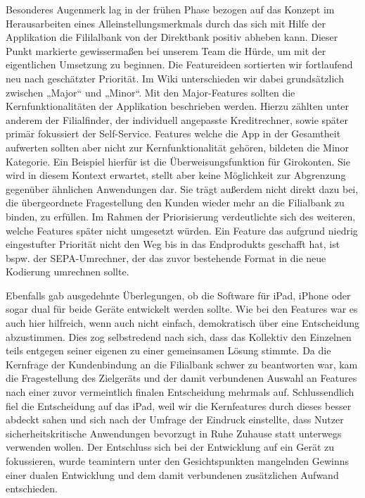 	Besonderes Augenmerk lag in der frühen Phase bezogen auf das Konzept im Herausarbeiten eines Alleinstellungsmerkmals durch das sich mit Hilfe der Applikation die Fililalbank von der Direktbank positiv abheben kann. Dieser Punkt markierte gewissermaßen bei unserem Team die Hürde, um mit der eigentlichen Umsetzung zu beginnen. Die Featureideen sortierten wir fortlaufend neu nach geschätzter Priorität. Im Wiki unterschieden wir dabei grundsätzlich zwischen „Major“ und „Minor“.  Mit den Major-Features sollten die Kernfunktionalitäten der Applikation beschrieben werden. Hierzu zählten unter anderem der Filialfinder, der individuell angepasste Kreditrechner, sowie später primär fokussiert der Self-Service. Features welche die App in der Gesamtheit aufwerten sollten aber nicht zur Kernfunktionalität gehören, bildeten die Minor Kategorie. Ein Beispiel hierfür ist die Überweisungsfunktion für Girokonten. Sie wird in diesem Kontext erwartet, stellt aber keine Möglichkeit zur Abgrenzung gegenüber ähnlichen Anwendungen dar. Sie trägt außerdem nicht direkt dazu bei, die übergeordnete Fragestellung den Kunden wieder mehr an die Filialbank zu binden, zu erfüllen. Im Rahmen der Priorisierung verdeutlichte sich des weiteren, welche Features später nicht umgesetzt würden. Ein Feature das aufgrund niedrig eingestufter Priorität nicht den Weg bis in das Endprodukts geschafft hat, ist bspw. der SEPA-Umrechner, der das zuvor bestehende Format in die neue Kodierung umrechnen sollte. 
	
	Ebenfalls gab ausgedehnte Überlegungen, ob die Software für iPad, iPhone oder sogar dual für beide Geräte entwickelt werden sollte. Wie bei den Features war es auch hier hilfreich, wenn auch nicht einfach, demokratisch über eine Entscheidung abzustimmen. Dies zog selbstredend nach sich, dass das Kollektiv den Einzelnen teils entgegen seiner eigenen zu einer gemeinsamen Lösung stimmte. Da die Kernfrage der Kundenbindung an die Filialbank schwer zu beantworten war, kam die Fragestellung des Zielgeräts und der damit verbundenen Auswahl an Features nach einer zuvor vermeintlich finalen Entscheidung mehrmals auf. Schlussendlich fiel die Entscheidung auf das iPad, weil wir die Kernfeatures durch dieses besser abdeckt sahen und sich nach der Umfrage der Eindruck einstellte, dass Nutzer sicherheitskritische Anwendungen bevorzugt in Ruhe Zuhause statt unterwegs verwenden wollen. Der Entschluss sich bei der Entwicklung auf ein Gerät zu fokussieren, wurde teamintern unter den Gesichtspunkten mangelnden Gewinns einer dualen Entwicklung und dem damit verbundenen zusätzlichen Aufwand entschieden.

